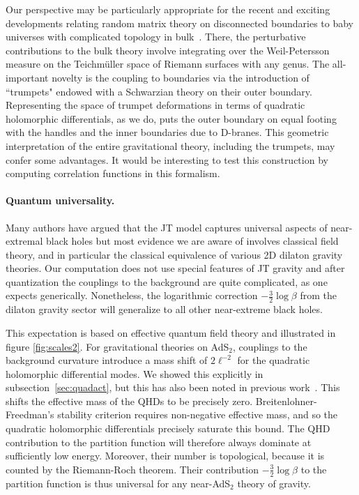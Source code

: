 \documentclass[12pt]{article}
\begin{document}
Our perspective may be particularly appropriate for the recent and exciting developments relating random matrix theory on disconnected boundaries to baby universes with complicated topology in bulk~\cite{Saad:2019lba,Stanford:2019vob}. There, the perturbative contributions to the bulk theory involve integrating over the Weil-Petersson measure on the Teichm\"{u}ller space of Riemann surfaces with any genus. The all-important novelty is the coupling to boundaries via the introduction of ``trumpets" endowed with a Schwarzian theory on their outer boundary. Representing the space of trumpet deformations in terms of quadratic holomorphic differentials, as we do, puts the outer boundary on equal footing with the handles and the inner boundaries due to D-branes. This geometric interpretation of the entire gravitational theory, including the trumpets, may confer some advantages. It would be interesting to test this construction by computing correlation functions in this formalism.

\paragraph{Quantum universality.}  Many authors have argued that the JT model captures universal aspects of near-extremal black holes but most evidence we are aware of involves classical field theory, and in particular the classical equivalence of various 2D dilaton gravity theories. Our computation does not use special features of JT gravity and after quantization the couplings to the background are quite complicated, as one expects generically. Nonetheless, the logarithmic correction $-\frac{3}{2}\log \beta$ from the dilaton gravity sector will generalize to all other near-extreme black holes. 

This expectation is based on effective quantum field theory and illustrated in figure \ref{fig:scales2}.  For gravitational theories on AdS$_2$, couplings to the background curvature introduce a mass shift of $2 \ell^{-2}$ for the quadratic holomorphic differential modes.  We showed this explicitly in subsection~\ref{sec:quadact}, but this has also been noted in previous work~\cite{Keeler:2014bra,Castro:2018ffi,Castro:2019crn}.  This shifts the effective mass of the QHDs to be precisely zero.  Breitenlohner-Freedman's stability criterion requires non-negative effective mass, and so the quadratic holomorphic differentials precisely saturate this bound.  The QHD contribution to the partition function will therefore always dominate at sufficiently low energy. Moreover, their number is topological, because it is counted by the Riemann-Roch theorem. Their contribution $-\frac{3}{2}\log \beta$ to the partition function is thus universal for any near-AdS$_2$ theory of gravity. 
\end{document}
